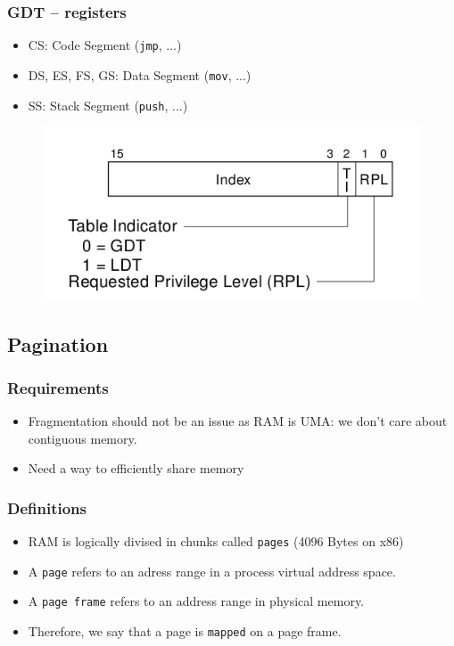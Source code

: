 \documentclass{beamer}
\begin{document}
\begin{frame}
  \frametitle{GDT -- registers}

  \begin{itemize}
  \item
    CS: Code Segment (\texttt{jmp}, ...)
  \item
    DS, ES, FS, GS: Data Segment (\texttt{mov}, ...)
  \item
    SS: Stack Segment (\texttt{push}, ...)
  \end{itemize}
  \begin{figure}
  \includegraphics[scale=0.5]{segreg.png}
  \end{figure}
\end{frame}

\subsection{Pagination}

\begin{frame}
  \frametitle{Requirements}

  \begin{itemize}
  \item
    Fragmentation should not be an issue as RAM is UMA: we don't care about contiguous memory.
  \item
    Need a way to efficiently share memory
  \end{itemize}
\end{frame}

\begin{frame}
  \frametitle{Definitions}

  \begin{itemize}
  \item
    RAM is logically divised in chunks called \texttt{pages} (4096 Bytes on x86)
  \item
    A \texttt{page} refers to an adress range in a process virtual address space.
  \item
    A \texttt{page frame} refers to an address range in physical memory.
  \item
    Therefore, we say that a page is \texttt{mapped} on a page frame.
  \end{itemize}
\end{frame}
\end{document}
